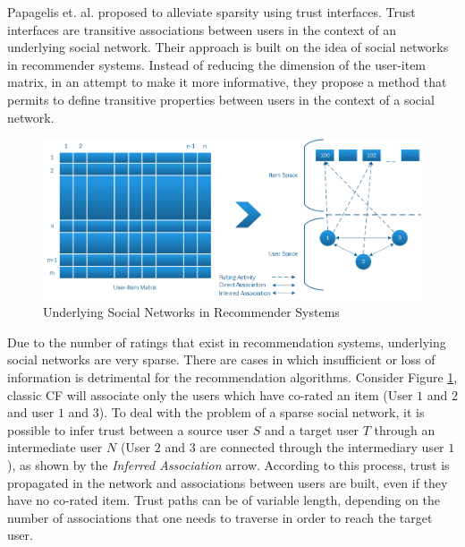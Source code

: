 






Papagelis et. al. \cite{Papagelis2005} proposed to alleviate sparsity using trust interfaces. Trust interfaces are transitive associations between users in the context of an underlying social network. Their approach is built on the idea of social networks in recommender systems. Instead of reducing the dimension of the user-item matrix, in an attempt to make it more informative, they propose a method that permits to define transitive properties between users in the context of a social network.

\begin{figure}[H]
    \includegraphics[width=5in]{image/trustnetwork.png}
    \centering
    \caption[Underlying Social Networks in Recommender Systems]{Underlying Social Networks in Recommender Systems}
    \label{figure:cfsocialnetwork}
\end{figure}

Due to the number of ratings that exist in recommendation systems, underlying social networks are very sparse. There are cases in which insufficient or loss of information is detrimental for the recommendation algorithms. Consider Figure \ref{figure:cfsocialnetwork}, classic CF will associate only the users which have co-rated an item (User $1$ and $2$ and user $1$ and $3$). To deal with the problem of a sparse social network, it is possible to infer trust between a source user $S$ and a target user $T$ through an intermediate user $N$ (User $2$ and $3$ are connected through the intermediary user $1$), as shown by the \emph{Inferred Association} arrow. According to this process, trust is propagated in the network and associations between users are built, even if they have no co-rated item. Trust paths can be of variable length, depending on the number of associations that one needs to traverse in order to reach the target user.





